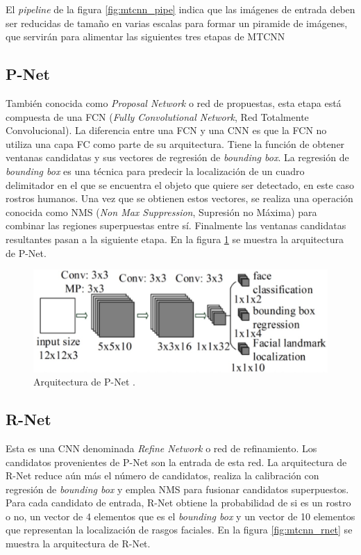 El \textit{pipeline} de la figura \ref{fig:mtcnn_pipe} indica que las imágenes de entrada deben ser reducidas de tamaño en varias escalas para formar un piramide de imágenes, que servirán para alimentar las siguientes tres etapas de MTCNN

\subsection{P-Net}
También conocida como \textit{Proposal Network} o red de propuestas, esta etapa está compuesta de una FCN (\textit{Fully Convolutional Network}, Red Totalmente Convolucional). La diferencia entre una FCN y una CNN es que la FCN no utiliza una capa FC como parte de su arquitectura. Tiene la función de obtener ventanas candidatas y sus vectores de regresión de \textit{bounding box}. La regresión de \textit{bounding box} es una técnica para predecir la localización de un cuadro delimitador en el que se encuentra el objeto que quiere ser detectado, en este caso rostros humanos. Una vez que se obtienen estos vectores, se realiza una operación conocida como NMS (\textit{Non Max Suppression}, Supresión no Máxima) para combinar las regiones superpuestas entre sí. Finalmente las ventanas candidatas resultantes pasan a la siguiente etapa. En la figura \ref{fig:mtcnn_pnet} se muestra la arquitectura de P-Net.

\begin{figure}[h]
	\centering
	\includegraphics[scale=0.25]{./Figures/mtcnn_pnet.png}
	\caption{Arquitectura de P-Net \cite{mtcnn_info}.}
	\label{fig:mtcnn_pnet}
\end{figure}
	
\subsection{R-Net}
Esta es una CNN denominada \textit{Refine Network} o red de refinamiento. Los candidatos provenientes de P-Net son la entrada de esta red. La arquitectura de R-Net reduce aún más el número de candidatos, realiza la calibración con regresión de \textit{bounding box} y emplea NMS para fusionar candidatos superpuestos. Para cada candidato de entrada, R-Net obtiene la probabilidad de si es un rostro o no, un vector de 4 elementos que es el \textit{bounding box} y un vector de 10 elementos que representan la localización de rasgos faciales. En la figura \ref{fig:mtcnn_rnet} se muestra la arquitectura de R-Net.

